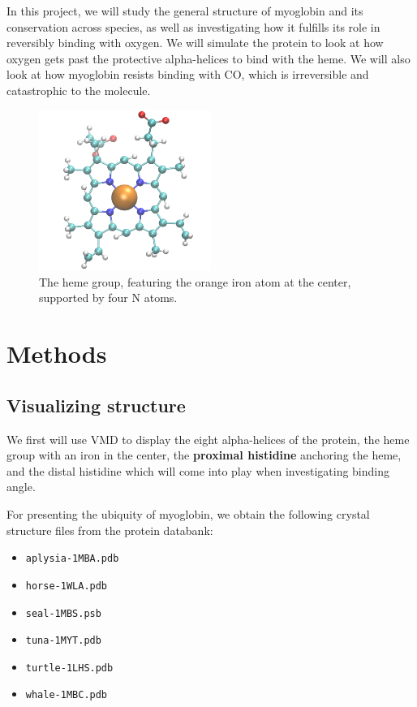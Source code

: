 \documentclass{article}
\begin{document}
In this project, we will study the general structure of myoglobin and its conservation across species, as well as investigating how it fulfills its role in reversibly binding with oxygen.  We will simulate the protein to look at how oxygen gets past the protective alpha-helices to bind with the heme.  We will also look at how myoglobin resists binding with CO, which is irreversible and catastrophic to the molecule.

\begin{figure}
	\centering
	\includegraphics[width=0.5\textwidth]{heme.png}
	\caption{The heme group, featuring the orange iron atom at the center, supported by four N atoms.}
	\label{fig:heme}
\end{figure}



\section{Methods}

\subsection{Visualizing structure}

We first will use VMD to display the eight alpha-helices of the protein, the heme group with an iron in the center, the \textbf{proximal histidine} anchoring the heme, and the distal histidine which will come into play when investigating binding angle.

For presenting the ubiquity of myoglobin, we obtain the following crystal structure files from the protein databank:

\begin{itemize}
	\item \lstinline|aplysia-1MBA.pdb|
	\item \lstinline|horse-1WLA.pdb|
	\item \lstinline|seal-1MBS.psb|
	\item \lstinline|tuna-1MYT.pdb|
	\item \lstinline|turtle-1LHS.pdb|
	\item \lstinline|whale-1MBC.pdb|
\end{itemize}
\end{document}
